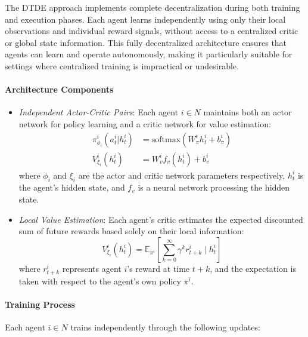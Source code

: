 The DTDE approach implements complete decentralization during both training and execution phases. Each agent learns independently using only their local observations and individual reward signals, without access to a centralized critic or global state information. This fully decentralized architecture ensures that agents can learn and operate autonomously, making it particularly suitable for settings where centralized training is impractical or undesirable.

\paragraph{Architecture Components}
\begin{itemize}
    \item \textit{Independent Actor-Critic Pairs}: Each agent $i \in N$ maintains both an actor network for policy learning and a critic network for value estimation:
    \begin{align*}
        \pi^i_{\phi_i}(a^i_t|h^i_t) &= \text{softmax}(W^i_{\pi}h^i_t + b^i_{\pi}) \\
        V^i_{\xi_i}(h^i_t) &= W^i_v f_v(h^i_t) + b^i_v
    \end{align*}
    where $\phi_i$ and $\xi_i$ are the actor and critic network parameters respectively, $h^i_t$ is the agent's hidden state, and $f_v$ is a neural network processing the hidden state.
    
    \item \textit{Local Value Estimation}: Each agent's critic estimates the expected discounted sum of future rewards based solely on their local information:
    \[
        V^i_{\xi_i}(h^i_t) = \mathbb{E}_{\pi^i}\left[\sum_{k=0}^{\infty} \gamma^k r_{t+k}^i \mid h^i_t\right]
    \]
    where $r_{t+k}^i$ represents agent $i$'s reward at time $t+k$, and the expectation is taken with respect to the agent's own policy $\pi^i$.
\end{itemize}

\paragraph{Training Process}
Each agent $i \in N$ trains independently through the following updates:

